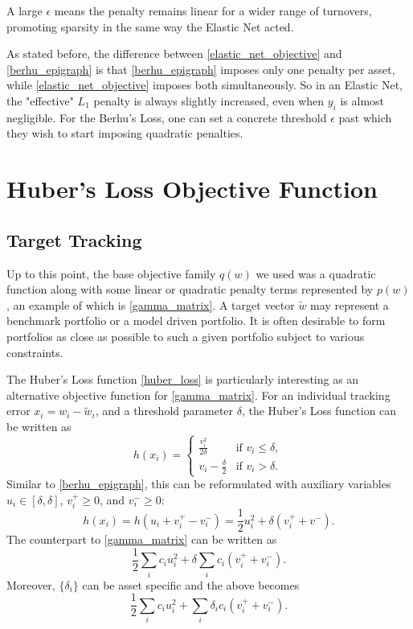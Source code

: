 \documentclass[11pt, letterpaper]{article}
\begin{document}
A large $\epsilon$ means the penalty remains linear for a wider range of turnovers, promoting sparsity in the same way the Elastic Net acted.

As stated before, the difference between \eqref{elastic_net_objective} and \eqref{berhu_epigraph} is that \eqref{berhu_epigraph} imposes only one penalty per asset,
while \eqref{elastic_net_objective} imposes both simultaneously. So in an Elastic Net, the "effective" $L_1$ penalty is always slightly increased, even when
$y_i$ is almost negligible. For the Berhu's Loss, one can set a concrete threshold $\epsilon$ past which they wish to start imposing quadratic penalties.


\section{Huber's Loss Objective Function}
\subsection{Target Tracking}
\label{target_objective_section}

Up to this point, the base objective family $q(w)$ we used was a quadratic function along with some linear or quadratic penalty
terms represented by $p(w)$, an example of which is \eqref{gamma_matrix}. A target vector $\tilde{w}$ may represent a benchmark
portfolio or a model driven portfolio. It is often desirable to form portfolios as close as possible to such a given portfolio
subject to various constraints.

The Huber's Loss function \eqref{huber_loss} is particularly interesting as an alternative objective function for
\eqref{gamma_matrix}. For an individual tracking error $x_i = w_i - \tilde{w}_i$, and a threshold parameter $\delta$, the
Huber's Loss function can be written as
\begin{equation*}
    h(x_i) = \begin{cases}
        \frac{v_i^2}{2\delta} & \text{if } v_i \leq \delta, \\
        v_i - \frac{\delta}{2} & \text{if } v_i > \delta.
    \end{cases}
\end{equation*}
Similar to \eqref{berhu_epigraph}, this can be reformulated with auxiliary variables $u_i\in [\delta, \delta]$, $v_i^+\geq 0$,
and $v_i^-\geq 0$:
\begin{equation}
	\label{huber_loss_deviation_epigraph}
	h(x_i) = h(u_i + v_i^+ - v_i^-) = \frac{1}{2}u_i^2 + \delta (v_i^+ + v^-).
\end{equation}
The counterpart to \eqref{gamma_matrix} can be written as
\begin{equation*}
	\frac{1}{2}\sum_i{c_iu_i^2} + \delta \sum_i{c_i(v_i^+ + v_i^-)}.
\end{equation*}
Moreover, $\{\delta_i\}$ can be asset specific and the above becomes
\begin{equation*}
	\frac{1}{2}\sum_i{c_iu_i^2} + \sum_i{\delta_i c_i(v_i^+ + v_i^-)}.
\end{equation*}
\end{document}
